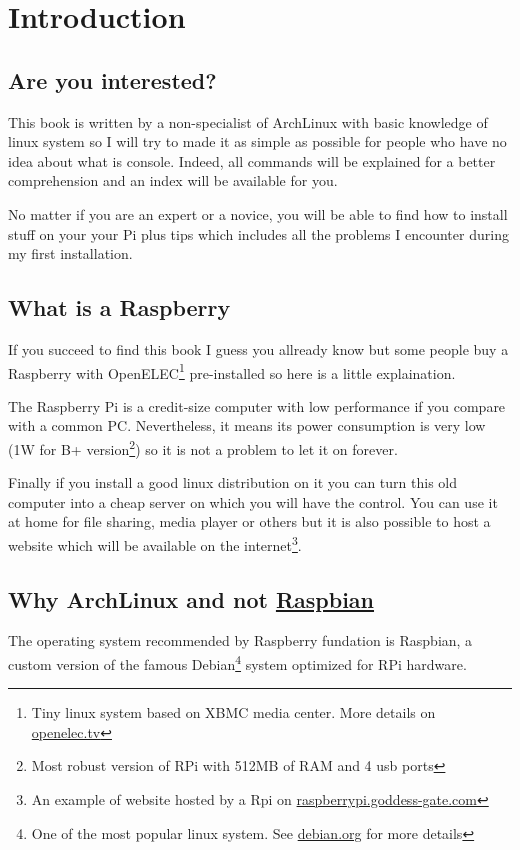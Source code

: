\chapter{Introduction}
	\section{Are you interested?}
This book is written by a non-specialist of ArchLinux with basic knowledge of 
linux system so I will try to made it as simple as possible for people 
who have no idea about what is console. Indeed, all commands will be 
explained for a better comprehension and an index will be available for you.

No matter if you are an expert or a novice, you will be able to find 
how to install stuff on your your Pi plus tips which includes all the problems 
I encounter during my first installation.

	\section{What is a Raspberry}
If you succeed to find this book I guess you allready know but some people 
buy a Raspberry with OpenELEC\footnote{Tiny linux system based on XBMC media center. 
More details on \href{http://openelec.tv}{openelec.tv}} pre-installed so here 
is a little explaination.

The Raspberry Pi is a credit-size computer with low performance if you
compare with a common PC. Nevertheless, it means its power consumption is
very low (1W for B+ version\footnote{Most robust version of RPi with 512MB 
of RAM and 4 usb ports}) so it is not a problem to let it on forever. 

Finally if you install a good linux distribution on it you can turn this old computer
into a cheap server on which you will have the control. You can use it 
at home for file sharing, media player or others but it is also possible
to host a website which will be available on the internet\footnote{An example
of website hosted by a Rpi on \href{http://raspberrypi.goddess-gate.com}
{raspberrypi.goddess-gate.com}}.

	\section{Why ArchLinux and not \href{http://www.raspbian.org}{Raspbian}}
The operating system recommended by Raspberry fundation is Raspbian, a custom 
version of the famous Debian\footnote{One of the most popular linux system. 
See \href{https://www.debian.org/intro/about}{debian.org} for more details} 
system optimized for RPi hardware. 

